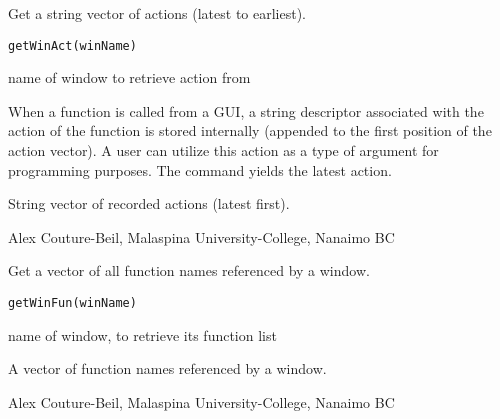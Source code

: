 \documentclass[letterpaper]{book}
\begin{document}
\begin{Description}\relax
Get a string vector of actions (latest to earliest).
\end{Description}
\begin{Usage}
\begin{verbatim}getWinAct(winName)\end{verbatim}
\end{Usage}
\begin{Arguments}
\begin{ldescription}
\item[\code{winName}] name of window to retrieve action from
\end{ldescription}
\end{Arguments}
\begin{Details}\relax
When a function is called from a GUI, a string descriptor associated with 
the action of the function is stored internally (appended to the first position 
of the action vector). A user can utilize this action as a type of argument 
for programming purposes. The command  yields the latest action.
\end{Details}
\begin{Value}
String vector of recorded actions (latest first).
\end{Value}
\begin{Author}\relax
Alex Couture-Beil, Malaspina University-College, Nanaimo BC
\end{Author}

\begin{Description}\relax
Get a vector of all function names referenced by a window.
\end{Description}
\begin{Usage}
\begin{verbatim}
getWinFun(winName)
\end{verbatim}
\end{Usage}
\begin{Arguments}
\begin{ldescription}
\item[\code{winName}] name of window, to retrieve its function list
\end{ldescription}
\end{Arguments}
\begin{Value}
A vector of function names referenced by a window.
\end{Value}
\begin{Author}\relax
Alex Couture-Beil, Malaspina University-College, Nanaimo BC
\end{Author}
\end{document}

